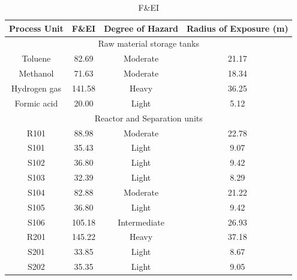 \begin{table}[H]
\centering
\caption{F\&EI }
\label{tab:radius}
\begin{tabular}{cccc}
\toprule\textbf{Process   Unit} & \textbf{F\&EI} & \textbf{Degree of Hazard} & \textbf{Radius of   Exposure (m)} \\\bottomrule
\multicolumn{4}{c}{Raw   material storage tanks}   
\\\hline
Toluene                 & 82.69          & Moderate                  & 21.17                              \\
Methanol                & 71.63          & Moderate                  & 18.34                              \\
Hydrogen gas            & 141.58         & Heavy                     & 36.25                              \\
Formic acid             & 20.00          & Light                     & 5.12                               \\\hline
\multicolumn{4}{c}{Reactor and Separation units}                                                        \\\hline
R101                    & 88.98          & Moderate                  & 22.78                              \\
S101                    & 35.43          & Light                     & 9.07                               \\
S102                    & 36.80          & Light                     & 9.42                               \\
S103                    & 32.39          & Light                     & 8.29                               \\
S104                    & 82.88          & Moderate                  & 21.22                              \\
S105                    & 36.80          & Light                     & 9.42                               \\
S106                    & 105.18         & Intermediate              & 26.93                              \\
R201                    & 145.22         & Heavy                     & 37.18                              \\
S201                    & 33.85          & Light                     & 8.67                               \\
S202                    & 35.35          & Light                     & 9.05                               \\

\end{tabular}
\end{table}
